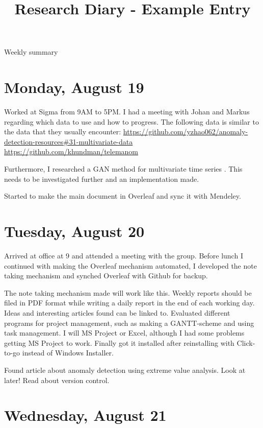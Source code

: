 \documentclass[11pt,letterpaper]{article}
\begin{document}
\univlogo

\title{Research Diary - Example Entry}

{\Huge Weekly summary}\\[5mm]

\section*{Monday, August 19}
Worked at Sigma from 9AM to 5PM. I had a meeting with Johan and Markus regarding which data to use and how to progress. The following data is similar to the data that they usually encounter: \newline
\url{https://github.com/yzhao062/anomaly-detection-resources#31-multivariate-data} \newline
\url{https://github.com/khundman/telemanom}

Furthermore, I researched a GAN method for multivariate time series \cite{Li2019a}. This needs to be investigated further and an implementation made.

Started to make the main document in Overleaf and sync it with Mendeley.

\section*{Tuesday, August 20}

Arrived at office at 9 and attended a meeting with the group. Before lunch I continued with making the Overleaf mechanism automated, I developed the note taking mechanism and synched Overleaf with Github for backup.   

The note taking mechanism made will work like this. Weekly reports should be filed in PDF format while writing a daily report in the end of each working day. Ideas and interesting articles found can be linked to.  
Evaluated different programs for project management, such as making a GANTT-scheme and using task management. I will MS Project or Excel, although I had some problems getting MS Project to work. Finally got it installed after reinstalling with Click-to-go instead of Windows Installer.

Found article about anomaly detection using extreme value analysis. Look at later! Read about version control.


\section*{Wednesday, August 21}
\end{document}
